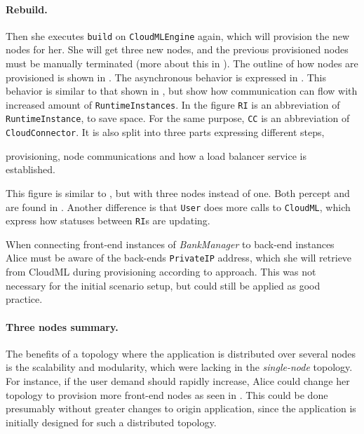 \paragraph{Rebuild.}


Then she executes \texttt{build} on \texttt{CloudMLEngine} again,
which will provision the new nodes for her.
She will get three new nodes, and the previous provisioned nodes must be manually terminated
(more about this in ).
The outline of how nodes are provisioned is shown in .
The asynchronous behavior is expressed in .
This behavior is similar to that shown in ,
but show how communication can flow with increased amount of \texttt{RuntimeInstances}.
In the figure \texttt{RI} is an abbreviation of \texttt{RuntimeInstance}, to save space.
For the same purpose, \texttt{CC} is an abbreviation of \texttt{CloudConnector}.
It is also split into three parts expressing different steps, 
\begin{ii}
  \iitem provisioning, 
  \iitem node communications and
  \iitem how a load balancer service is established.
\end{ii}
This figure is similar to , but with three nodes instead of one.
Both percept  and  are found in .
Another difference is that \texttt{User} does more calls to \texttt{CloudML},
which express how statuses between \texttt{RI}s are updating.

When connecting front-end instances of \emph{BankManager} to back-end instances Alice must 
be aware of the back-ends \texttt{PrivateIP} address, which she will retrieve from CloudML
during provisioning according to  approach.
This was not necessary for the initial scenario setup, but could still be applied
as good practice.

\paragraph{Three nodes summary.}


The benefits of a topology where the application is distributed over several nodes 
is the scalability and modularity, which were lacking in the \emph{single-node} topology.
For instance, if the user demand should rapidly increase, Alice could change her topology to
provision more front-end nodes as seen in .
This could be done presumably without greater changes to origin application,
since the application is initially designed for such a distributed topology.

